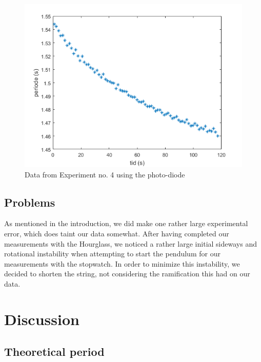 \documentclass[%
 reprint,
 amsmath,amssymb,
 aps,
]{revtex4-1}
\begin{document}
        \begin{figure}[h!]
        	\center
        	\includegraphics[scale=0.6]{forsok4fig1}
        	\caption{Data from Experiment no. 4 using the photo-diode}
            \label{fig:data4}
        \end{figure}

    \subsection{\label{disc_problems}Problems}
        As mentioned in the introduction, we did make one rather large experimental error, which does taint our data somewhat. After having completed our measurements with the Hourglass, we noticed a rather large initial sideways and rotational instability when attempting to start the pendulum for our measurements with the stopwatch. In order to minimize this instability, we decided to shorten the string, not considering the ramification this had on our data.


\section{Discussion}
	\subsection{Theoretical period}
\end{document}
